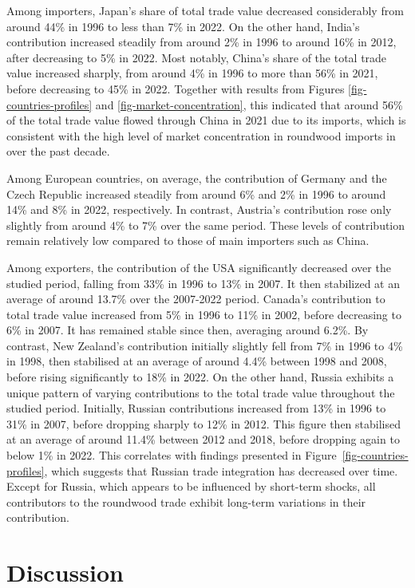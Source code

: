 \documentclass[
  authoryear,
  review,
  3p]{elsarticle}
\begin{document}
Among importers, Japan's share of total trade value decreased
considerably from around 44\% in 1996 to less than 7\% in 2022. On the
other hand, India's contribution increased steadily from around 2\% in
1996 to around 16\% in 2012, after decreasing to 5\% in 2022. Most
notably, China's share of the total trade value increased sharply, from
around 4\% in 1996 to more than 56\% in 2021, before decreasing to 45\%
in 2022. Together with results from Figures \ref{fig-countries-profiles}
and \ref{fig-market-concentration}, this indicated that around 56\% of
the total trade value flowed through China in 2021 due to its imports,
which is consistent with the high level of market concentration in
roundwood imports in over the past decade.

Among European countries, on average, the contribution of Germany and
the Czech Republic increased steadily from around 6\% and 2\% in 1996 to
around 14\% and 8\% in 2022, respectively. In contrast, Austria's
contribution rose only slightly from around 4\% to 7\% over the same
period. These levels of contribution remain relatively low compared to
those of main importers such as China.

Among exporters, the contribution of the USA significantly decreased
over the studied period, falling from 33\% in 1996 to 13\% in 2007. It
then stabilized at an average of around 13.7\% over the 2007-2022
period. Canada's contribution to total trade value increased from 5\% in
1996 to 11\% in 2002, before decreasing to 6\% in 2007. It has remained
stable since then, averaging around 6.2\%. By contrast, New Zealand's
contribution initially slightly fell from 7\% in 1996 to 4\% in 1998,
then stabilised at an average of around 4.4\% between 1998 and 2008,
before rising significantly to 18\% in 2022. On the other hand, Russia
exhibits a unique pattern of varying contributions to the total trade
value throughout the studied period. Initially, Russian contributions
increased from 13\% in 1996 to 31\% in 2007, before dropping sharply to
12\% in 2012. This figure then stabilised at an average of around 11.4\%
between 2012 and 2018, before dropping again to below 1\% in 2022. This
correlates with findings presented in
Figure~\ref{fig-countries-profiles}, which suggests that Russian trade
integration has decreased over time. Except for Russia, which appears to
be influenced by short-term shocks, all contributors to the roundwood
trade exhibit long-term variations in their contribution.

\section{Discussion}\label{discussion}
\end{document}
